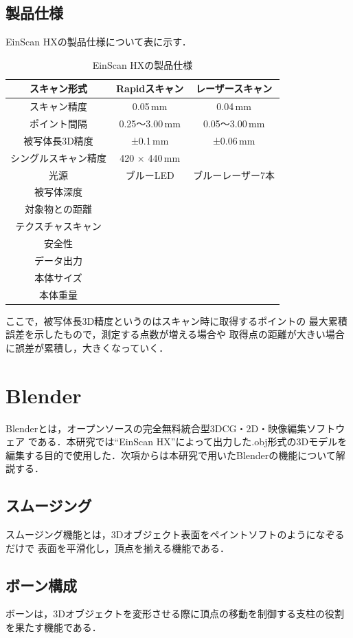 \documentclass{ltjsreport}
\begin{document}
		\subsection{製品仕様}
			EinScan HXの製品仕様について表に示す．
			\begin{table}[H]
			\begin{center}
			\caption{EinScan HXの製品仕様}
			\label{tab:EinScan}
			\begin{tabular}{c|cc} \toprule
				スキャン形式&Rapidスキャン&レーザースキャン\\ \hline
				スキャン精度&0.05\,mm&0.04\,mm\\
				ポイント間隔&0.25～3.00\,mm&0.05～3.00\,mm\\
				被写体長3D精度&±0.1\,mm&±0.06\,mm\\
				シングルスキャン精度&420 × 440\,mm&\\
				光源&ブルーLED&ブルーレーザー7本\\
				被写体深度&&\\
				対象物との距離&&\\
				テクスチャスキャン&&\\
				安全性&&\\
				データ出力&&\\
				本体サイズ&&\\
				本体重量&&\\
				\bottomrule
			\end{tabular}
			\end{center}
			\end{table}
			ここで，被写体長3D精度というのはスキャン時に取得するポイントの
			最大累積誤差を示したもので，測定する点数が増える場合や
			取得点の距離が大きい場合に誤差が累積し，大きくなっていく．

	\section{Blender}
	
		Blenderとは，オープンソースの完全無料統合型3DCG・2D・映像編集ソフトウェア
		である．本研究では``EinScan HX''によって出力した.obj形式の3Dモデルを
		編集する目的で使用した．次項からは本研究で用いたBlenderの機能について解説する．
		\subsection{スムージング}
			スムージング機能とは，3Dオブジェクト表面をペイントソフトのようになぞるだけで
			表面を平滑化し，頂点を揃える機能である．
		\subsection{ボーン構成}
			ボーンは，3Dオブジェクトを変形させる際に頂点の移動を制御する支柱の役割を果たす機能である．
\end{document}
